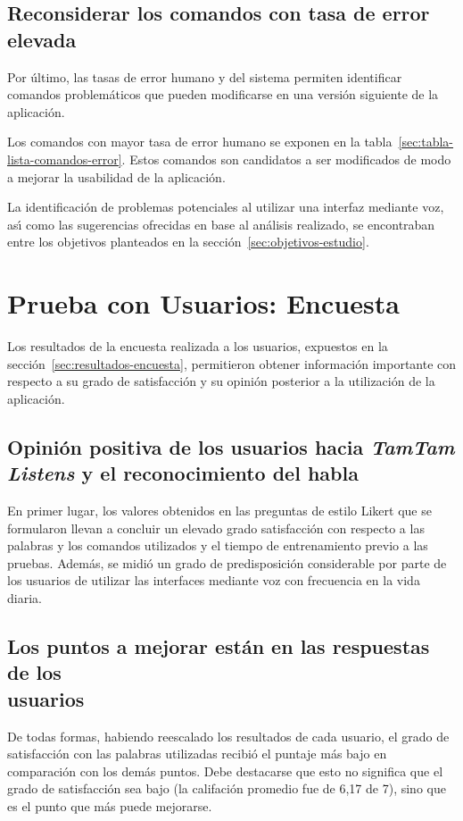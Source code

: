 \subsection{Reconsiderar los comandos con tasa de error elevada}
Por \'ultimo, las tasas de error humano y del sistema permiten identificar comandos 
problem\'aticos que pueden modificarse en una versi\'on siguiente de la aplicaci\'on.

Los comandos con mayor tasa de error humano se exponen en la tabla~\ref{sec:tabla-lista-comandos-error}.
Estos comandos son candidatos a ser modificados de modo a mejorar la usabilidad de la
aplicaci\'on.

La identificaci\'on de problemas potenciales al utilizar una interfaz mediante voz, as{\'\i} como 
las sugerencias ofrecidas en base al an\'alisis realizado, se encontraban entre los objetivos planteados 
en la secci\'on~\ref{sec:objetivos-estudio}.

\section{Prueba con Usuarios: Encuesta}
Los resultados de la encuesta realizada a los usuarios, expuestos en la secci\'on~\ref{sec:resultados-encuesta},
permitieron obtener informaci\'on importante con respecto a su grado de satisfacci\'on y su opini\'on 
posterior a la utilizaci\'on de la aplicaci\'on.

\subsection[Opini\'on positiva de los usuarios hacia \emph{TamTam Listens} y el \\ reconocimiento del habla]
{Opini\'on positiva de los usuarios hacia \emph{TamTam Listens} y el reconocimiento del habla}
En primer lugar, los valores obtenidos en las preguntas de estilo Likert que se formularon
llevan a concluir un elevado grado satisfacci\'on con respecto a las palabras y los comandos
utilizados y el tiempo de entrenamiento previo a las pruebas.
Adem\'as, se midi\'o un grado de predisposici\'on considerable por parte de los usuarios de utilizar
las interfaces mediante voz con frecuencia en la vida diaria.

\subsection[Los puntos a mejorar est\'an en las respuestas de los usuarios]
{Los puntos a mejorar est\'an en las respuestas de los \\ usuarios}
De todas formas, habiendo reescalado los resultados de cada usuario, el grado de satisfacci\'on
con las palabras utilizadas recibi\'o el puntaje m\'as bajo en comparaci\'on con los dem\'as puntos.
Debe destacarse que esto no significa que el grado de satisfacci\'on sea bajo (la califaci\'on promedio
fue de 6,17 de 7), sino que es el punto que m\'as puede mejorarse.

